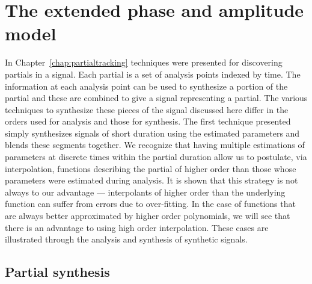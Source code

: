 \chapter{The extended phase and amplitude model\label{chap:exphsmodel}}

In Chapter~\ref{chap:partialtracking} techniques were presented for discovering
partials in a signal. Each partial is a set of analysis points indexed by time.
The information at each analysis point can be used to synthesize a portion of
the partial and these are combined to give a signal representing a partial.
The various techniques to synthesize these pieces of the signal discussed here
differ in the orders used for analysis and those for synthesis. The first
technique presented simply synthesizes signals of short duration using the
estimated parameters and blends these segments together. We recognize that
having multiple estimations of parameters at discrete times within the partial
duration allow us to postulate, via interpolation, functions describing the
partial of higher order than those whose parameters were estimated during
analysis. It is shown that this strategy is not always to our advantage ---
interpolants of higher order than the underlying function can suffer from errors
due to over-fitting. In the case of functions that are always better
approximated by higher order polynomials, we will see that there is an advantage
to using high order interpolation. These cases are illustrated through the
analysis and synthesis of synthetic signals.

\section{Partial synthesis \label{sec:partialsynthesis}}

